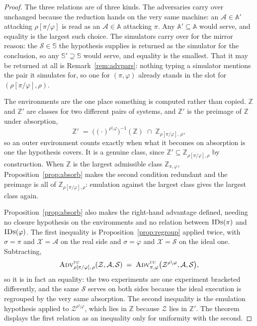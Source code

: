\documentclass[11pt,a4paper]{article}
\newcommand{\Zenv}{\mathcal{Z}}
\newcommand{\Adv}{\mathcal{A}}
\newcommand{\Sim}{\mathcal{S}}
\newcommand{\advtg}{\op{Adv}}
\newcommand{\Aset}{\mathbb{A}}
\newcommand{\SimSet}{\mathbb{S}}
\newcommand{\ZenvSet}{\mathbb{Z}}
\newcommand{\op}[1]{\textsc{#1}}
\newcommand{\IDs}{\op{IDs}}
\theoremstyle{accentdef}
\theoremstyle{accentplain}
\begin{document}
\begin{proof}
The three relations are of three kinds. The adversaries carry over unchanged because the
reduction hands on the very same machine: an $\Adv \in \Aset'$ attacking $\rho[\pi/\varphi]$ is
read as an $\Adv \in \Aset$ attacking $\pi$. Any $\Aset' \subseteq \Aset$ would serve, and
equality is the largest such choice. The simulators carry over for the mirror reason: the
$\Sim \in \SimSet$ the hypothesis supplies is returned as the simulator for the conclusion, so
any $\SimSet' \supseteq \SimSet$ would serve, and equality is the smallest. That it may be
returned at all is Remark~\ref{rem:advpars}: nothing typing a simulator mentions the pair it
simulates for, so one for $(\pi,\varphi)$ already stands in the slot for
$(\rho[\pi/\varphi],\rho)$.

The environments are the one place something is computed rather than copied. $\ZenvSet$ and
$\ZenvSet'$ are classes for two different pairs of systems, and $\ZenvSet'$ is the preimage of
$\ZenvSet$ under absorption,
\[
  \ZenvSet' \;=\; \bigl((\cdot)^{\rho \setminus \varphi}\bigr)^{-1}(\ZenvSet) \;\cap\; \ZenvSet_{\rho[\pi/\varphi],\,\rho} ,
\]
so an outer environment counts exactly when what it becomes on absorption is one the hypothesis
covers. It is a genuine class, since $\ZenvSet' \subseteq \ZenvSet_{\rho[\pi/\varphi],\rho}$ by
construction. When $\ZenvSet$ is the largest admissible class $\ZenvSet_{\pi,\varphi}$,
Proposition~\ref{prop:absorb} makes the second condition redundant and the preimage is all of
$\ZenvSet_{\rho[\pi/\varphi],\rho}$: emulation against the largest class gives the largest class
again.

Proposition~\ref{prop:absorb} also makes the right-hand advantage defined, needing no closure
hypothesis on the environments and no relation between $\IDs(\pi)$ and $\IDs(\varphi)$.
The first inequality is Proposition~\ref{prop:regroup} applied twice, with $\sigma = \pi$ and
$\mathcal{X} = \Adv$ on the real side and $\sigma = \varphi$ and $\mathcal{X} = \Sim$ on the
ideal one. Subtracting,
\[
  \advtg^{\op{uc}}_{\rho[\pi/\varphi],\,\rho}(\Zenv,\Adv,\Sim)
  \;=\;
  \advtg^{\op{uc}}_{\pi,\varphi}\bigl(\Zenv^{\rho \setminus \varphi},\Adv,\Sim\bigr) ,
\]
so it is in fact an equality: the two experiments are one experiment bracketed differently, and
the same $\Sim$ serves on both sides because the ideal execution is regrouped by the very same
absorption. The second inequality is the emulation hypothesis applied to
$\Zenv^{\rho \setminus \varphi}$, which lies in $\ZenvSet$ because $\Zenv$ lies in $\ZenvSet'$.
The theorem displays the first relation as an inequality only for uniformity with the second.
\end{proof}
\end{document}
